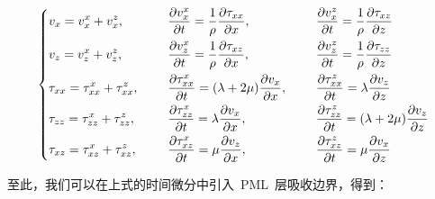 \documentclass[UTF8]{ctexart}
\begin{document}
\begin{equation}
\left\{ \begin{aligned}
& v_x=v_x^x+v_x^z, & \hspace{5mm} & \frac{\partial v_x^x}{\partial t}=\frac{1}{\rho}\frac{\partial \tau_{xx}}{\partial x}, & \hspace{5mm} & \frac{\partial v_x^z}{\partial t}=\frac{1}{\rho}\frac{\partial \tau_{xz}}{\partial z} \\
& v_z=v_z^x+v_z^z, & \hspace{5mm} & \frac{\partial v_z^x}{\partial t}=\frac{1}{\rho}\frac{\partial \tau_{xz}}{\partial x}, & \hspace{5mm} & \frac{\partial v_z^z}{\partial t}=\frac{1}{\rho}\frac{\partial \tau_{zz}}{\partial z} \\
& \tau_{xx}=\tau_{xx}^x+\tau_{xx}^z, & \hspace{5mm} & \frac{\partial \tau_{xx}^x}{\partial t}=(\lambda+2\mu)\frac{\partial v_x}{\partial x}, & \hspace{5mm} & \frac{\partial \tau_{xx}^z}{\partial t}=\lambda\frac{\partial v_z}{\partial z} \\
& \tau_{zz}=\tau_{zz}^x+\tau_{zz}^z, & \hspace{5mm} & \frac{\partial \tau_{zz}^x}{\partial t}=\lambda\frac{\partial v_x}{\partial x}, & \hspace{5mm} & \frac{\partial \tau_{zz}^z}{\partial t}=(\lambda+2\mu)\frac{\partial v_z}{\partial z} \\
& \tau_{xz}=\tau_{xz}^x+\tau_{xz}^z, & \hspace{5mm} & \frac{\partial \tau_{xz}^x}{\partial t}=\mu\frac{\partial v_z}{\partial x}, & \hspace{5mm} & \frac{\partial \tau_{xz}^z}{\partial t}=\mu\frac{\partial v_x}{\partial z}
\end{aligned} \right.
\end{equation}\par
至此，我们可以在上式的时间微分中引入~PML~层吸收边界，得到：
\end{document}
